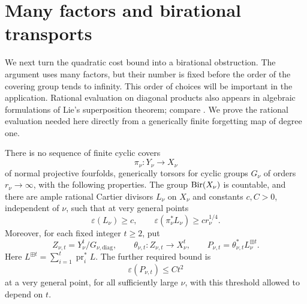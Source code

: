 \section{Many factors and birational transports}
\label{sec:transports}

We next turn the quadratic cost bound into a birational obstruction.
The argument uses many factors, but their number is fixed before the order
of the covering group tends to infinity.  This order of choices will be
important in the application. Rational evaluation on diagonal products
also appears in algebraic formulations of Lie's superposition theorem;
compare \cite[\S\S3,6--7 and Theorem~7.1]{BlazquezSanzMorales2010}.
We prove the rational evaluation needed here directly from a generically finite
forgetting map of degree one.

\begin{proposition}\label{prop:many-factor-contradiction}
There is no sequence of finite cyclic covers
\[
 \pi_\nu:Y_\nu\longrightarrow X_\nu
\]
of normal projective fourfolds, generically torsors for cyclic groups
\(G_\nu\) of orders \(r_\nu\to\infty\), with the following properties.
The group \(\operatorname{Bir}(X_\nu)\) is countable, and there are ample rational
Cartier divisors \(L_\nu\) on \(X_\nu\) and constants \(c,C>0\),
independent of \(\nu\), such that at very general points
\[
 \varepsilon(L_\nu)\ge c,
 \qquad
 \varepsilon(\pi_\nu^*L_\nu)\ge c r_\nu^{1/4}.
\]
Moreover, for each fixed integer \(t\ge2\), put
\[
 Z_{\nu,t}=Y_\nu^t/G_{\nu,\mathrm{diag}},\qquad
 \theta_{\nu,t}:Z_{\nu,t}\longrightarrow X_\nu^t,
 \qquad
 P_{\nu,t}=\theta_{\nu,t}^*L_\nu^{\boxplus t}.
\]
Here \(L^{\boxplus t}=\sum_{i=1}^t\operatorname{pr}_i^*L\).
The further required bound is
\[
 \varepsilon(P_{\nu,t})\le Ct^2
\]
at a very general point, for all sufficiently large \(\nu\), with this
threshold allowed to depend on \(t\).
\end{proposition}

